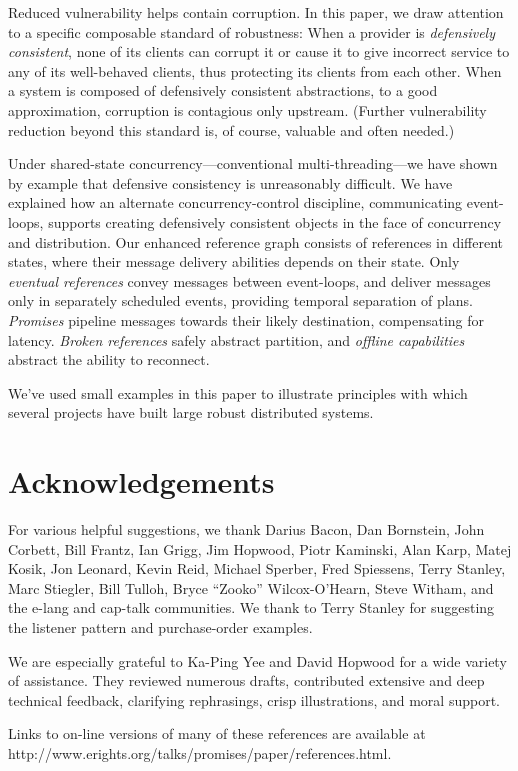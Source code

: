 \documentclass{llncs}
\begin{document}
Reduced vulnerability helps contain corruption. In this paper, we draw
attention to a specific composable standard of robustness: When a
provider is \emph{defensively consistent}, none of its clients can
corrupt it or cause it to give incorrect service to any of its
well-behaved clients, thus protecting its clients from each
other. When a system is composed of defensively consistent
abstractions, to a good approximation, corruption is contagious only
upstream. (Further vulnerability reduction beyond this standard is, of
course, valuable and often needed.)

Under shared-state concurrency---conventional multi-threading---we
have shown by example that defensive consistency is unreasonably
difficult. We have explained how an alternate concurrency-control
discipline, communicating event-loops, supports creating defensively
consistent objects in the face of concurrency and distribution. Our
enhanced reference graph consists of references in different states,
where their message delivery abilities depends on their state. Only
\emph{eventual references} convey messages between event-loops, and
deliver messages only in separately scheduled events, providing
temporal separation of plans. \emph{Promises} pipeline messages
towards their likely destination, compensating for
latency. \emph{Broken references} safely abstract partition, and
\emph{offline capabilities} abstract the ability to reconnect.

We've used small examples in this paper to illustrate principles with
which several projects have built large robust distributed systems.

\section{Acknowledgements}
For various helpful suggestions, we thank
Darius Bacon,
Dan Bornstein,
John Corbett,
Bill Frantz,
Ian Grigg,
Jim Hopwood,
Piotr Kaminski,
Alan Karp,
Matej Kosik,
Jon Leonard,
Kevin Reid,
Michael Sperber,
Fred Spiessens,
Terry Stanley,
Marc Stiegler,
Bill Tulloh,
Bryce ``Zooko'' Wilcox-O'Hearn,
Steve Witham,
and the e-lang and cap-talk communities.
We thank to Terry Stanley for suggesting the listener pattern
and purchase-order examples.

We are especially grateful to Ka-Ping Yee and David Hopwood for a wide
variety of assistance. They reviewed numerous drafts, contributed
extensive and deep technical feedback, clarifying rephrasings, crisp
illustrations, and moral support.


%
Links to on-line versions of many of these references are available at
http://www.erights.org/talks/promises/paper/references.html.

%

\end{document}
